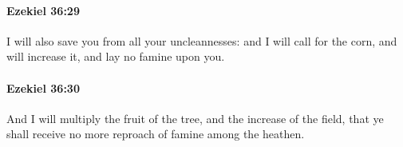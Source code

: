 		\paragraph{Ezekiel 36:29} %
			\label{EZEKIEL-36-29}

			I will also save you from all your uncleannesses: and I will call for the corn, and will increase it, and lay no famine upon you.


		\paragraph{Ezekiel 36:30} %
			\label{EZEKIEL-36-30}

			And I will multiply the fruit of the tree, and the increase of the field, that ye shall receive no more reproach of famine among the heathen.



